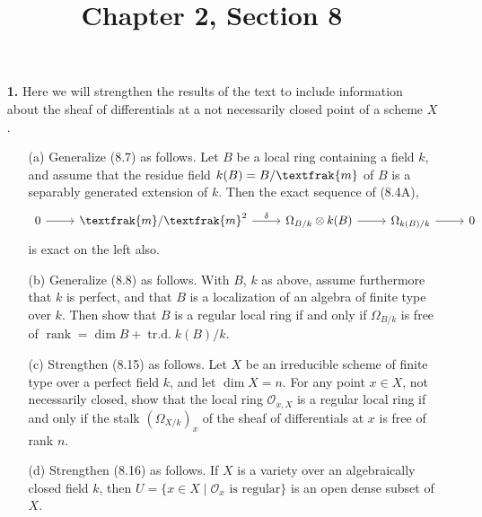 \documentclass{article}
\title{Chapter 2, Section 8}
\newcommand{\goth}[1]{\textfrak{#1}}
\newcommand{\fO}{\mathcal{O}}
\DeclareMathOperator{\rk}{rank}
\DeclareMathOperator{\trd}{tr.d.}
\begin{document}
\maketitle
\begin{enumerate} [label=\textbf{\arabic*.}, leftmargin=0em]


\item[\textbf{1.}] Here we will strengthen the results of the text to include information about the sheaf of differentials at a not necessarily closed point of a scheme $X$.
\begin{itemize} [leftmargin=0cm]
    \item[(a)] Generalize (8.7) as follows. Let $B$ be a local ring containing a field $k$, and assume that the residue field $k(B) = B / \goth{m}$ of $B$ is a separably generated extension of $k$. Then the exact sequence of (8.4A),
    \[ \begin{tikzcd}
        0 \arrow[r] & \goth{m}/\goth{m}^2 \arrow[r, "\delta"] & \Omega_{B/k} \otimes k(B) \arrow[r] & \Omega_{k(B)/k} \arrow[r] & 0
        \end{tikzcd} \]
    is exact on the left also.
    \item[(b)] Generalize (8.8) as follows. With $B$, $k$ as above, assume furthermore that $k$ is perfect, and that $B$ is a localization of an algebra of finite type over $k$. Then show that $B$ is a regular local ring if and only if $\Omega_{B/k}$ is free of $\rk{} = \dim{B} + \trd k(B) / k$.
    \item[(c)] Strengthen (8.15) as follows. Let $X$ be an irreducible scheme of finite type over a perfect field $k$, and let $\dim{X} = n$. For any point $x \in X$, not necessarily closed, show that the local ring $\fO_{x, X}$ is a regular local ring if and only if the stalk $(\Omega_{X/k})_x$ of the sheaf of differentials at $x$ is free of rank $n$.
    \item[(d)] Strengthen (8.16) as follows. If $X$ is a variety over an algebraically closed field $k$, then $U = \{x \in X \mid \fO_x \text{ is regular} \}$ is an open dense subset of $X$.
\end{itemize}


\end{enumerate}
\end{document}
